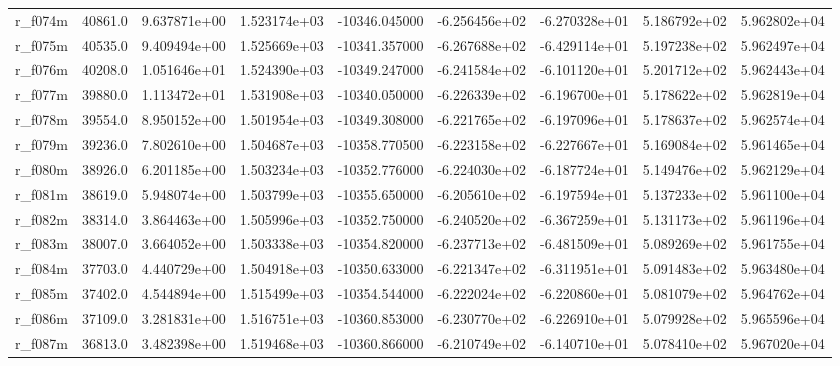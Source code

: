 \documentclass[10pt]{article}
\begin{document}
\begin{landscape}
\begin{longtable}{lrrrrrrrr}
r\_f074m                 &   40861.0 &  9.637871e+00 &  1.523174e+03 & -10346.045000 & -6.256456e+02 & -6.270328e+01 &  5.186792e+02 &  5.962802e+04 \\
r\_f075m                 &   40535.0 &  9.409494e+00 &  1.525669e+03 & -10341.357000 & -6.267688e+02 & -6.429114e+01 &  5.197238e+02 &  5.962497e+04 \\
r\_f076m                 &   40208.0 &  1.051646e+01 &  1.524390e+03 & -10349.247000 & -6.241584e+02 & -6.101120e+01 &  5.201712e+02 &  5.962443e+04 \\
r\_f077m                 &   39880.0 &  1.113472e+01 &  1.531908e+03 & -10340.050000 & -6.226339e+02 & -6.196700e+01 &  5.178622e+02 &  5.962819e+04 \\
r\_f078m                 &   39554.0 &  8.950152e+00 &  1.501954e+03 & -10349.308000 & -6.221765e+02 & -6.197096e+01 &  5.178637e+02 &  5.962574e+04 \\
r\_f079m                 &   39236.0 &  7.802610e+00 &  1.504687e+03 & -10358.770500 & -6.223158e+02 & -6.227667e+01 &  5.169084e+02 &  5.961465e+04 \\
r\_f080m                 &   38926.0 &  6.201185e+00 &  1.503234e+03 & -10352.776000 & -6.224030e+02 & -6.187724e+01 &  5.149476e+02 &  5.962129e+04 \\
r\_f081m                 &   38619.0 &  5.948074e+00 &  1.503799e+03 & -10355.650000 & -6.205610e+02 & -6.197594e+01 &  5.137233e+02 &  5.961100e+04 \\
r\_f082m                 &   38314.0 &  3.864463e+00 &  1.505996e+03 & -10352.750000 & -6.240520e+02 & -6.367259e+01 &  5.131173e+02 &  5.961196e+04 \\
r\_f083m                 &   38007.0 &  3.664052e+00 &  1.503338e+03 & -10354.820000 & -6.237713e+02 & -6.481509e+01 &  5.089269e+02 &  5.961755e+04 \\
r\_f084m                 &   37703.0 &  4.440729e+00 &  1.504918e+03 & -10350.633000 & -6.221347e+02 & -6.311951e+01 &  5.091483e+02 &  5.963480e+04 \\
r\_f085m                 &   37402.0 &  4.544894e+00 &  1.515499e+03 & -10354.544000 & -6.222024e+02 & -6.220860e+01 &  5.081079e+02 &  5.964762e+04 \\
r\_f086m                 &   37109.0 &  3.281831e+00 &  1.516751e+03 & -10360.853000 & -6.230770e+02 & -6.226910e+01 &  5.079928e+02 &  5.965596e+04 \\
r\_f087m                 &   36813.0 &  3.482398e+00 &  1.519468e+03 & -10360.866000 & -6.210749e+02 & -6.140710e+01 &  5.078410e+02 &  5.967020e+04 \\

\end{longtable}
\end{landscape}
\end{document}
